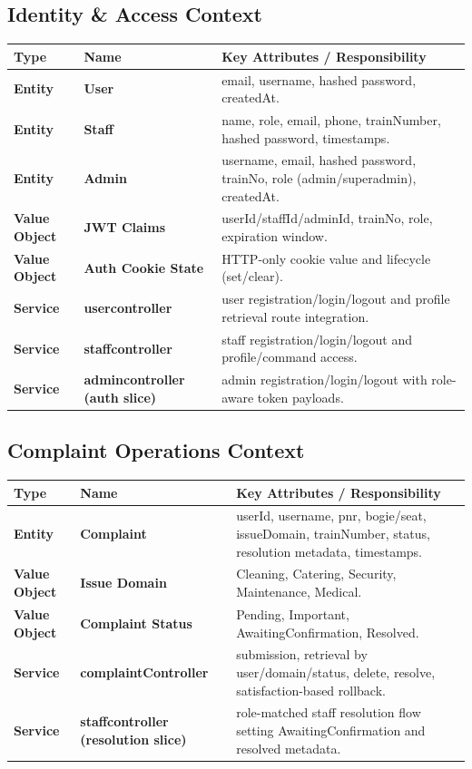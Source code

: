 \documentclass[12pt,a4paper]{report}
\begin{document}
\subsection{Identity \& Access Context}
\begin{table}[H]
\centering
\begin{tabularx}{\textwidth}{>{\bfseries}p{} >{\bfseries}p{} Y}
\toprule
{}
\textcolor{TableHeaderText}{Type} & \textcolor{TableHeaderText}{Name} & \textcolor{TableHeaderText}{Key Attributes / Responsibility} \\
\midrule
Entity & User & email, username, hashed password, createdAt. \\
Entity & Staff & name, role, email, phone, trainNumber, hashed password, timestamps. \\
Entity & Admin & username, email, hashed password, trainNo, role (admin/superadmin), createdAt. \\
Value Object & JWT Claims & userId/staffId/adminId, trainNo, role, expiration window. \\
Value Object & Auth Cookie State & HTTP-only cookie value and lifecycle (set/clear). \\
Service & usercontroller & user registration/login/logout and profile retrieval route integration. \\
Service & staffcontroller & staff registration/login/logout and profile/command access. \\
Service & admincontroller (auth slice) & admin registration/login/logout with role-aware token payloads. \\
\bottomrule
\end{tabularx}
\end{table}

\subsection{Complaint Operations Context}
\begin{table}[H]
\centering
\begin{tabularx}{\textwidth}{>{\bfseries}p{} >{\bfseries}p{} Y}
\toprule
{}
\textcolor{TableHeaderText}{Type} & \textcolor{TableHeaderText}{Name} & \textcolor{TableHeaderText}{Key Attributes / Responsibility} \\
\midrule
Entity & Complaint & userId, username, pnr, bogie/seat, issueDomain, trainNumber, status, resolution metadata, timestamps. \\
Value Object & Issue Domain & Cleaning, Catering, Security, Maintenance, Medical. \\
Value Object & Complaint Status & Pending, Important, AwaitingConfirmation, Resolved. \\
Service & complaintController & submission, retrieval by user/domain/status, delete, resolve, satisfaction-based rollback. \\
Service & staffcontroller (resolution slice) & role-matched staff resolution flow setting AwaitingConfirmation and resolved metadata. \\
\bottomrule
\end{tabularx}
\end{table}
\end{document}
